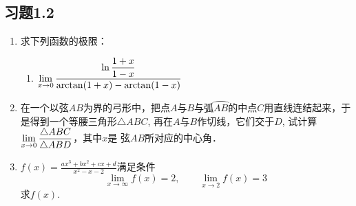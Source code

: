 \subsection*{习题1.2}
\begin{enumerate}
    \item 求下列函数的极限：
\begin{enumerate}   
    \item $\displaystyle\lim_{x\to 0}\dfrac{\ln\dfrac{1+x}{1-x}}{\arctan(1+x)-\arctan(1-x)}$
\end{enumerate} 

\item 在一个以弦$AB$为界的弓形中，把点$A$与$B$与弧$\wideparen{AB}$的中点$C$用直线连结起来，于是得到一个等腰三角形$\triangle  ABC$, 再在$A$与$B$作切线，它们交于$D$, 试计算$\displaystyle\lim_{x\to 0}\dfrac{\triangle ABC}{\triangle ABD}$，其中$x$是
弦$AB$所对应的中心角．

\item $f(x)=\frac{ax^3+bx^2+cx+d}{x^2-x-2}$满足条件
\[\lim_{x\to \infty} f(x)=2,\qquad \lim_{x\to 2} f(x)=3\]
求$f(x)$.
\end{enumerate}

